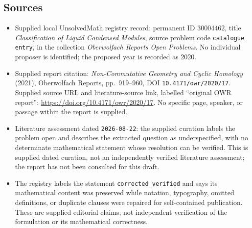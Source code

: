 \documentclass[11pt]{article}
\begin{document}
\subsection{Sources}
\begin{itemize}
\item Supplied local UnsolvedMath registry record: permanent ID \(30004462\), title \emph{Classification of Liquid Condensed Modules}, source problem code \texttt{catalogue entry}, in the collection \emph{Oberwolfach Reports Open Problems}. No individual proposer is identified; the proposed year is recorded as 2020.
\item Supplied report citation: \emph{Non-Commutative Geometry and Cyclic Homology} (2021), Oberwolfach Reports, pp.\ 919--960, DOI \texttt{10.4171/owr/2020/17}. Supplied source URL and literature-source link, labelled ``original OWR report'': \url{https://doi.org/10.4171/owr/2020/17}. No specific page, speaker, or passage within the report is supplied.
\item Literature assessment dated \texttt{2026-08-22}: the supplied curation labels the problem open and describes the extracted question as underspecified, with no determinate mathematical statement whose resolution can be verified. This is supplied dated curation, not an independently verified literature assessment; the report has not been consulted for this draft.
\item The registry labels the statement \texttt{corrected\_verified} and says its mathematical content was preserved while notation, typography, omitted definitions, or duplicate clauses were repaired for self-contained publication. These are supplied editorial claims, not independent verification of the formulation or its mathematical correctness.
\end{itemize}
\end{document}
